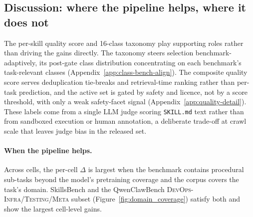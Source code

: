\subsection{Discussion: where the pipeline helps, where it does not}
\label{sec:discussion}

The per-skill quality score and 16-class taxonomy play supporting
roles rather than driving the gains directly.\label{sec:claim-a}
The taxonomy steers selection benchmark-adaptively, its post-gate
class distribution concentrating on each benchmark's task-relevant
classes (Appendix~\ref{app:class-bench-align}).  The composite
quality score serves deduplication tie-breaks and retrieval-time
ranking rather than per-task prediction, and the active set is
gated by safety and licence, not by a score threshold, with
only a weak safety-facet signal (Appendix~\ref{app:quality-detail}).
\ifarxiv\else
These labels come from a single LLM judge scoring \texttt{SKILL.md}
text rather than from sandboxed execution or human annotation, a
deliberate trade-off at crawl scale that leaves judge bias in the
released set.
\fi

\paragraph{When the pipeline helps.}
Across cells, the per-cell $\Delta$ is largest when the benchmark
contains procedural sub-tasks beyond the
model's pretraining coverage and the corpus covers the task's
domain.  SkillsBench and the QwenClawBench
\textsc{DevOps-Infra}/\textsc{Testing}/\textsc{Meta} subset
(Figure~\ref{fig:domain_coverage}) satisfy both and show the
largest cell-level gains.

